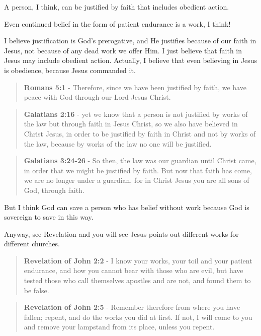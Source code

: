 \documentclass[11pt]{article}
\begin{document}
A person, I think, can be justified by faith that includes obedient action.

Even continued belief in the form of patient endurance is a work, I think!

I believe justification is God's prerogative, and He justifies because of our faith in Jesus, not because of any dead work we offer Him. I just believe that faith in Jesus may include obedient action.
Actually, I believe that even believing in Jesus is obedience, because Jesus commanded it.

\begin{quote}
\textbf{Romans 5:1} - Therefore, since we have been justified by faith, we have peace with God through our Lord Jesus Christ.
\end{quote}

\begin{quote}
\textbf{Galatians 2:16} - yet we know that a person is not justified by works of the law but through faith in Jesus Christ, so we also have believed in Christ Jesus, in order to be justified by faith in Christ and not by works of the law, because by works of the law no one will be justified.
\end{quote}

\begin{quote}
\textbf{Galatians 3:24-26} - So then, the law was our guardian until Christ came, in order that we might be justified by faith. But now that faith has come, we are no longer under a guardian, for in Christ Jesus you are all sons of God, through faith.
\end{quote}

But I think God can save a person who has belief without work because God is sovereign to save in this way.

Anyway, see Revelation and you will see Jesus points out different works for different churches.

\begin{quote}
\textbf{Revelation of John 2:2} - I know your works, your toil and your patient endurance, and how you cannot bear with those who are evil, but have tested those who call themselves apostles and are not, and found them to be false.
\end{quote}

\begin{quote}
\textbf{Revelation of John 2:5} - Remember therefore from where you have fallen; repent, and do the works you did at first. If not, I will come to you and remove your lampstand from its place, unless you repent.
\end{quote}
\end{document}
